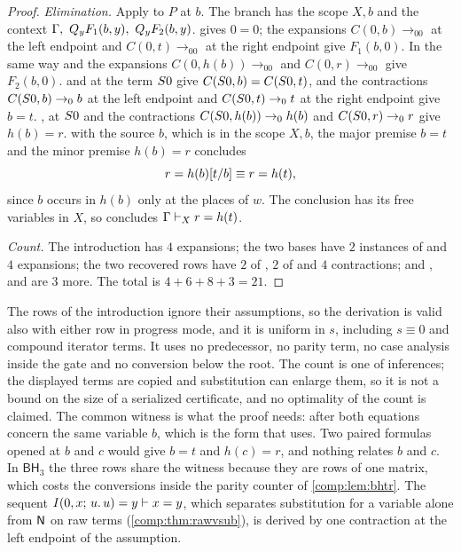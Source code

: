 \begin{proof}
\emph{Elimination.} Apply  to $P$ at $b$. The branch has the
scope $X,b$ and the context
$\Gamma,\ \Q{y}F_1(b,y),\ \Q{y}F_2(b,y)$.  gives $0=0$; the
expansions $C(0,b)\to_00$ at the left endpoint and $C(0,t)\to_00$ at the
right endpoint give $F_1(b,0)$. In the same way  and the
expansions $C(0,h(b))\to_00$ and $C(0,r)\to_00$ give $F_2(b,0)$. 
and  at the term $S 0$ give
$C(S 0,b)=C(S 0,t)$, and the contractions $C(S 0,b)\to_0b$ at the
left endpoint and $C(S 0,t)\to_0t$ at the right endpoint give $b=t$.
,  at $S 0$ and the contractions
$C(S 0,h(b))\to_0h(b)$ and $C(S 0,r)\to_0r$ give $h(b)=r$.
 with the source $b$, which is in the scope $X,b$, the major
premise $b=t$ and the minor premise $h(b)=r$ concludes
\[
 r=h(b)[t/b]\equiv r=h(t),
\]
since $b$ occurs in $h(b)$ only at the places of $w$. The conclusion has its
free variables in $X$, so  concludes $\Gamma\vdash_Xr=h(t)$.

\emph{Count.} The introduction has $4$ expansions; the two bases have $2$
instances of  and $4$ expansions; the two recovered rows have
$2$ of , $2$ of  and $4$ contractions; and
,  and  are $3$ more. The total is
$4+6+8+3=21$.
\end{proof}

The rows of the introduction ignore their assumptions, so the derivation is
valid also with either row in progress mode, and it is uniform in $s$,
including $s\equiv0$ and compound iterator terms. It uses no predecessor, no
parity term, no case analysis inside the gate and no conversion below the
root. The count is one of inferences; the displayed terms are copied and
substitution can enlarge them, so it is not a bound on the size of a
serialized certificate, and no optimality of the count is claimed. The
common witness is what the proof needs: after  both equations
concern the same variable $b$, which is the form that  uses.
Two paired formulas opened at $b$ and $c$ would give $b=t$ and $h(c)=r$, and
nothing relates $b$ and $c$. In $\mathsf{BH}_3$ the three rows share the
witness because they are rows of one matrix, which costs the conversions
inside the parity counter of \cref{comp:lem:bhtr}. The sequent
$I(0,x;\,u.\,u)=y\vdash x=y$, which separates substitution for a variable
alone from $\mathsf{N}$ on raw terms (\cref{comp:thm:rawvsub}), is derived by one
contraction at the left endpoint of the assumption.

